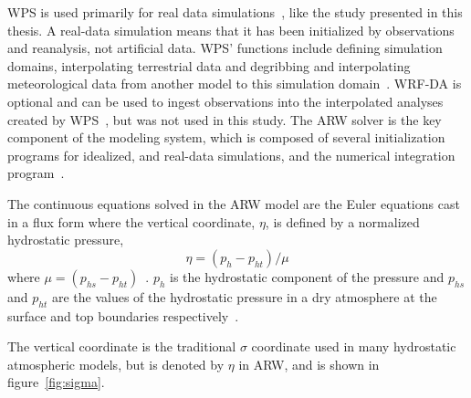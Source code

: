 WPS is used primarily for real data simulations~\citep{Wang2015}, like the study presented in this thesis. A real-data simulation means that it has been initialized by observations and reanalysis, not artificial data. WPS' functions include defining simulation domains, interpolating terrestrial data and degribbing and interpolating meteorological data from another model to this simulation domain~\citep{Wang2015}. WRF-DA is optional and can be used to ingest observations into the interpolated analyses created by WPS~\citep{Wang2015}, but was not used in this study. The ARW solver is the key component of the modeling system, which is composed of several initialization programs for idealized, and real-data simulations, and the numerical integration program~\citep{Wang2015}.

The continuous equations solved in the ARW model are the Euler equations cast in a flux form where the vertical coordinate, $\eta$, is defined by a normalized hydrostatic pressure,
\begin{equation}
\eta = (p_h - p_{ht})/\mu 
\end{equation}
where $\mu = (p_{hs} - p_{ht})$~\citep{Skamarock2008}. $p_h$ is the hydrostatic component of the pressure and $p_{hs}$ and $p_{ht}$ are the values of the hydrostatic pressure in a dry atmosphere at the surface and top boundaries respectively~\citep{Skamarock2008}.

The vertical coordinate is the traditional $\sigma$ coordinate used in many hydrostatic atmospheric models, but is denoted by $\eta$ in ARW, and is shown in figure~\ref{fig:sigma}.

